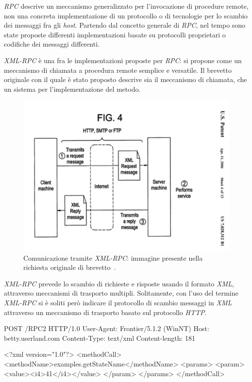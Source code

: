 \emph{RPC} descrive un meccanismo generalizzato per l'invocazione di procedure remote, non una concreta implementazione di un protocollo o di tecnologie per lo scambio dei messaggi fra gli \emph{host}. Partendo dal concetto generale di \emph{RPC}, nel tempo sono state proposte differenti implementazioni basate su protocolli proprietari o codifiche dei messaggi differenti.~\cite{JAIRATH:2004:misc}~\cite{dcerpc}

\emph{XML-RPC} è una fra le implementazioni proposte per \emph{RPC}: si propone come un meccanismo di chiamata a procedura remote semplice e versatile. Il brevetto originale con il quale è stato proposto descrive sia il meccanismo di chiamata, che un sistema per l'implementazione del metodo.~\cite{MERRICK:2006:misc}

\begin{figure}[h]
\centering
\includegraphics[scale=0.5, viewport=0 0 646 440]{Immagini/Capitolo3/XMLRPC-patent.pdf}
\caption[Comunicazione tramite \emph{XML-RPC}]{Comunicazione tramite \emph{XML-RPC}: immagine presente nella richiesta originale di brevetto~\cite{MERRICK:2006:misc}.}\label{fig:xmlrpc-patent}
\end{figure}

\emph{XML-RPC} prevede lo scambio di richieste e risposte usando il formato \emph{XML}, attraverso meccanismi di trasporto multipli. Solitamente, con l'uso del termine \emph{XML-RPC} si è soliti però indicare il protocollo di scambio messaggi in \emph{XML} attraverso un meccanismo di trasporto basato sul protocollo \emph{HTTP}.

\begin{program}
\begin{verbatimtab}

POST /RPC2 HTTP/1.0
User-Agent: Frontier/5.1.2 (WinNT)
Host: betty.userland.com
Content-Type: text/xml
Content-length: 181


<?xml version="1.0"?>
<methodCall>
   <methodName>examples.getStateName</methodName>
   <params>
      <param>
         <value><i4>41</i4></value>
         </param>
      </params>
   </methodCall>
\end{verbatimtab}
\caption{Esempio di chiamata ad una procedura remota usando \emph{XML-RPC over HTTP}}\label{code:xmlrpc-request}
\end{program}

